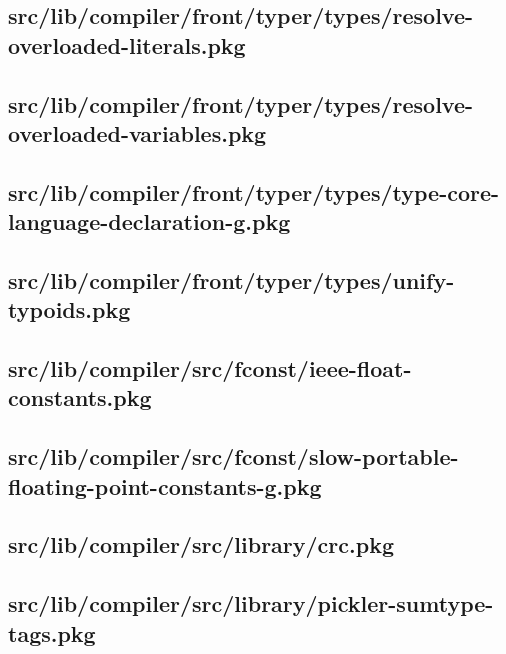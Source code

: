 \subsection{src/lib/compiler/front/typer/types/resolve-overloaded-literals.pkg}


\subsection{src/lib/compiler/front/typer/types/resolve-overloaded-variables.pkg}


\subsection{src/lib/compiler/front/typer/types/type-core-language-declaration-g.pkg}


\subsection{src/lib/compiler/front/typer/types/unify-typoids.pkg}


\subsection{src/lib/compiler/src/fconst/ieee-float-constants.pkg}


\subsection{src/lib/compiler/src/fconst/slow-portable-floating-point-constants-g.pkg}


\subsection{src/lib/compiler/src/library/crc.pkg}


\subsection{src/lib/compiler/src/library/pickler-sumtype-tags.pkg}


